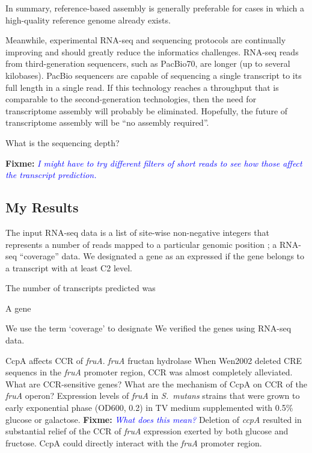 \documentclass{article}
\newcommand{\fixme}[1]{{\textbf{Fixme:} \textit{\textcolor{blue}{#1}}}}
\begin{document}
In summary, reference-based assembly is generally preferable for cases in which
a high-quality reference genome already exists.

Meanwhile, experimental RNA-seq and sequencing protocols are continually
improving and should greatly reduce the informatics challenges.  RNA-seq reads
from third-generation sequencers, such as PacBio70, are longer (up to several
kilobases). PacBio sequencers are capable of sequencing a single transcript to
its full length in a single read. If this technology reaches a throughput that
is comparable to the second-generation technologies, then the need for
transcriptome assembly will probably be eliminated. Hopefully, the future of
transcriptome assembly will be ``no assembly required''.

What is the sequencing depth?

\fixme{I might have to try different filters of short reads to see how those
affect the transcript prediction.}

\subsection{My Results}


The input RNA-seq data is a list of site-wise non-negative integers that
represents a number of reads mapped to a particular genomic position
\citet{Martin2010}; a RNA-seq ``coverage'' data. We designated a gene as an
expressed if the gene belongs to a transcript with at least C2 level.

The number of transcripts predicted was

A gene 

We use the term `coverage' to designate 
We verified the genes using RNA-seq data. 

CcpA affects CCR of \textit{fruA}. 
\textit{fruA} fructan hydrolase
When Wen2002 deleted CRE sequencs in the \textit{fruA} promoter region, CCR was
almost completely alleviated. 
What are CCR-sensitive genes? 
What are the mechanism of CcpA on CCR of the \textit{fruA} operon? 
Expression levels of \textit{fruA} in \textit{S.\ mutans} strains that were
grown to early exponential phase (OD600, 0.2) in TV medium supplemented with
0.5\% glucose or galactose. \fixme{What does this mean?} 
Deletion of \textit{ccpA} resulted in substantial relief of the CCR of
\textit{fruA} expression exerted by both glucose and fructose. 
CcpA could directly interact with the \textit{fruA} promoter region. 
\end{document}
